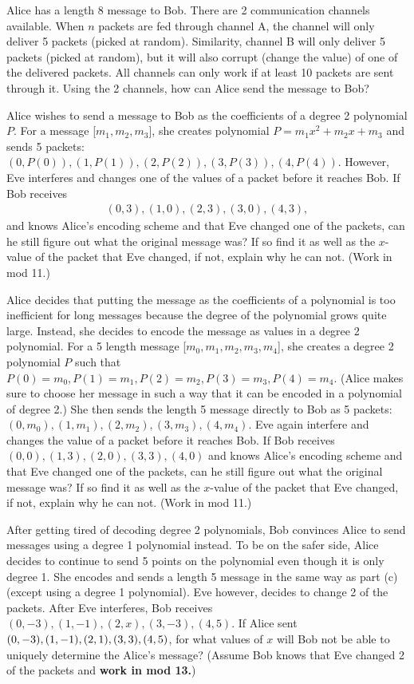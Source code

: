 \begin{Parts}
\Part
Alice has a length 8 message to Bob. There are 2 communication channels available. When $n$ packets are fed through channel A, the channel will only deliver 5 packets (picked at random). Similarity, channel B will only deliver 5 packets (picked at random), but it will also corrupt (change the value) of one of the delivered packets. All channels can only work if at least 10 packets are sent through it. Using the 2 channels, how can Alice send the message to Bob?

\Part Alice wishes to send a message to Bob as the coefficients of a degree 2 polynomial $P$. For a message [$m_1, m_2, m_3$], she creates polynomial $P = m_1x^2 + m_2x + m_3$ and sends 5 packets: $(0, P(0)), (1, P(1)), (2, P(2)), (3, P(3)), (4, P(4))$. However, Eve interferes and changes one of the values of a packet before it reaches Bob. If Bob receives
    \begin{align*}
      (0, 3), (1, 0), (2, 3), (3, 0), (4, 3),
    \end{align*}
    and knows Alice's encoding scheme and that Eve changed one of the packets, can he still figure out what the original message was? If so find it as well as the $x$-value of the packet that Eve changed, if not, explain why he can not. (Work in mod 11.)

\Part Alice decides that putting the message as the coefficients of a polynomial is too inefficient for long messages because the degree of the polynomial grows quite large. Instead, she decides to encode the message as values in a degree 2 polynomial. For a 5 length message [$m_0, m_1, m_2, m_3, m_4$], she creates a degree 2 polynomial $P$ such that $P(0) = m_0, P(1) = m_1, P(2) = m_2, P(3) = m_3, P(4) = m_4$. (Alice makes sure to choose her message in such a way that it can be encoded in a polynomial of degree 2.) She then sends the length 5 message directly to Bob as 5 packets: $(0, m_0), (1, m_1), (2, m_2), (3, m_3), (4, m_4)$. Eve again interfere and changes the value of a packet before it reaches Bob. If Bob receives $(0, 0), (1, 3), (2, 0), (3, 3), (4, 0)$ and knows Alice's encoding scheme and that Eve changed one of the packets, can he still figure out what the original message was? If so find it as well as the $x$-value of the packet that Eve changed, if not, explain why he can not. (Work in mod 11.)

\Part After getting tired of decoding degree 2 polynomials, Bob convinces Alice to send messages using a degree 1 polynomial instead. To be on the safer side, Alice decides to continue to send 5 points on the polynomial even though it is only degree 1. She encodes and sends a length 5 message in the same way as part (c) (except using a degree 1 polynomial). Eve however, decides to change 2 of the packets. After Eve interferes, Bob receives $(0, -3), (1, -1), (2, x), (3, -3), (4, 5)$. If Alice sent $(0, -3), (1, -1), (2, 1), (3, 3), \\ (4, 5)$, for what values of $x$ will Bob not be able to uniquely determine the Alice's message? (Assume Bob knows that Eve changed 2 of the packets and \textbf{work in mod 13.})
\end{Parts}


